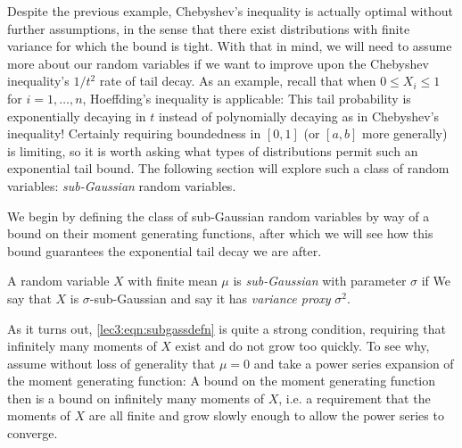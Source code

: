 Despite the previous example, Chebyshev's inequality is actually optimal without further assumptions, in the sense that there exist distributions with finite variance for which the bound is tight. With that in mind, we will need to assume more about our random variables if we want to improve upon the Chebyshev inequality's $1/t^2$ rate of tail decay. As an example, recall that when $0 \leq X_i \leq 1$ for $i = 1, \ldots, n$, Hoeffding's inequality is applicable:
This tail probability is exponentially decaying in $t$ instead of polynomially decaying as in Chebyshev's inequality! Certainly requiring boundedness in $[0, 1]$ (or $[a, b]$ more generally) is limiting, so it is worth asking what types of distributions permit such an exponential tail bound. The following section will explore such a class of random variables: \emph{sub-Gaussian} random variables.


We begin by defining the class of sub-Gaussian random variables by way of a bound on their moment generating functions, after which we will see how this bound guarantees the exponential tail decay we are after.

\begin{definition}
    A random variable $X$ with finite mean $\mu$ is \textit{sub-Gaussian} with parameter $\sigma$ if
    We say that $X$ is $\sigma$-sub-Gaussian and say it has \emph{variance proxy} $\sigma^2$.
\end{definition}

\begin{remark}\label{lec3:rem:mgf_strong}
    As it turns out, \eqref{lec3:eqn:subgassdefn} is quite a strong condition, requiring that infinitely many moments of $X$ exist and do not grow too quickly. To see why, assume without loss of generality that $\mu = 0$ and take a power series expansion of the moment generating function:
    A bound on the moment generating function then is a bound on infinitely many moments of $X$, i.e. a requirement that the moments of $X$ are all finite and grow slowly enough to allow the power series to converge.
\end{remark}


